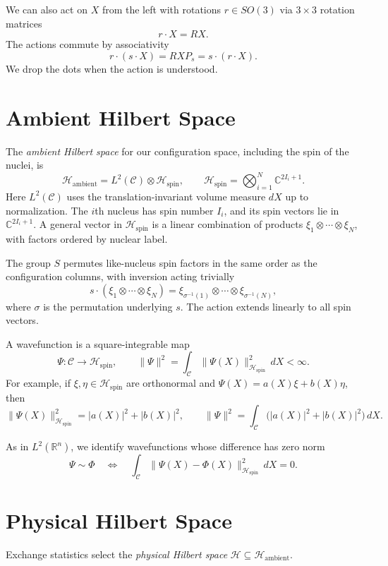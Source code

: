 \documentclass[12pt]{article}
\newcommand{\R}{\mathbb{R}}
\newcommand{\hilb}{\mathcal{H}}
\newcommand{\conf}{\mathcal{C}}
\newcommand{\spin}{\mathcal{H}_{\mathrm{spin}}}
\newcommand{\act}{\mathbin{\cdot}}
\begin{document}
We can also act on $X$ from the left with rotations
$r\in SO(3)$ via $3\times3$ rotation matrices
\[
r\act X=RX.
\]
The actions commute by associativity
\[
r\act(s\act X)=RXP_s=s\act(r\act X).
\]
We drop the dots when the action is understood.



\section{Ambient Hilbert Space}

The \emph{ambient Hilbert space} for our configuration space,
including the spin of the nuclei, is
\[
\hilb_{\mathrm{ambient}}=L^2(\conf)\otimes\spin,
\qquad
\spin=\bigotimes_{i=1}^{N}\mathbb C^{2I_i+1}.
\]
Here $L^2(\conf)$ uses the translation-invariant volume
measure $dX$ up to normalization.
The $i$th nucleus has spin number $I_i$, and its
spin vectors lie in $\mathbb C^{2I_i+1}$. A general vector
in $\spin$ is a linear combination of products
$\xi_1\otimes\cdots\otimes\xi_N$, with factors ordered
by nuclear label.

The group $S$ permutes like-nucleus spin factors in the
same order as the configuration columns, with inversion
acting trivially
\[
s\act(\xi_1\otimes\cdots\otimes\xi_N)
=
\xi_{\sigma^{-1}(1)}\otimes\cdots\otimes
\xi_{\sigma^{-1}(N)},
\]
where $\sigma$ is the permutation underlying $s$.
The action extends linearly to all spin vectors.

A wavefunction is a square-integrable map
\[
\Psi:\conf\to\spin,
\qquad
\|\Psi\|^2
=
\int_{\conf}\|\Psi(X)\|_{\spin}^2\,dX<\infty.
\]
For example, if $\xi,\eta\in\spin$ are orthonormal and
$\Psi(X)=a(X)\xi+b(X)\eta$, then
\[
\|\Psi(X)\|_{\spin}^2=|a(X)|^2+|b(X)|^2,
\qquad
\|\Psi\|^2
=
\int_{\conf}\bigl(|a(X)|^2+|b(X)|^2\bigr)\,dX.
\]

As in $L^2(\R^n)$, we identify wavefunctions whose
difference has zero norm
\[
\Psi\sim\Phi
\quad\Longleftrightarrow\quad
\int_{\conf}
\|\Psi(X)-\Phi(X)\|_{\spin}^2\,dX=0.
\]

\section{Physical Hilbert Space}

Exchange statistics select the \emph{physical Hilbert
space} $\hilb\subseteq\hilb_{\mathrm{ambient}}$.
\end{document}
